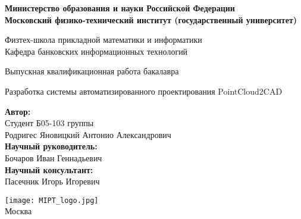 \begin{center}
    \large\textbf{Министерство образования и науки Российской Федерации \\
        Московский физико-технический институт (государственный
        университет)} \\
    \vspace{1cm}

    Физтех-школа прикладной математики и информатики \\

    Кафедра банковских информационных технологий \\

    \vspace{3em}

    Выпускная квалификационная работа бакалавра
\end{center}

\begin{center}
    \vspace{\fill}
    \LARGE{Разработка системы автоматизированного проектирования PointCloud2CAD}

    \vspace{\fill}
\end{center}

\begin{flushright}
    \textbf{Автор:} \\
    Студент Б05-103 группы \\
    Родригес Яновицкий Антонио Александрович \\
    \vspace{2em}
    \textbf{Научный руководитель:} \\
    Бочаров Иван Геннадьевич \\
    \vspace{2em}
    \textbf{Научный консультант:} \\
    Пасечник Игорь Игоревич \\
\end{flushright}

\vspace{7em}

\begin{center}
    \texttt{[image: MIPT\_logo.jpg]}\\
    Москва \the\year{}
\end{center}

\thispagestyle{empty}

\newpage
\setcounter{page}{2}
\fancyfoot[c]{\thepage}
\fancyhead[R]{}
